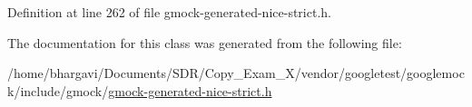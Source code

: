 Definition at line 262 of file gmock-\/generated-\/nice-\/strict.\+h.



The documentation for this class was generated from the following file\+:\begin{DoxyCompactItemize}
\item 
/home/bhargavi/\+Documents/\+S\+D\+R/\+Copy\+\_\+\+Exam\+\_\+X/vendor/googletest/googlemock/include/gmock/\hyperlink{gmock-generated-nice-strict_8h}{gmock-\/generated-\/nice-\/strict.\+h}\end{DoxyCompactItemize}
